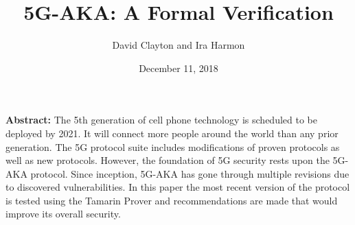 \documentclass[10pt, pdftex]{article}
\title{5G-AKA: A Formal Verification}
\author{David Clayton and Ira Harmon}
\date{December 11, 2018}
\begin{document}
\maketitle
\textbf{Abstract:} 
The 5th generation of cell phone technology is scheduled to be deployed by 2021.  It will connect more people around the world than any prior generation.  The 5G protocol suite includes modifications of proven protocols as well as new protocols.  However, the foundation of 5G security rests upon the 5G-AKA protocol.  Since inception, 5G-AKA has gone through multiple revisions due to discovered vulnerabilities.  In this paper the most recent version of the protocol is tested using the Tamarin Prover and recommendations are made that would improve its overall security.
\end{document}
